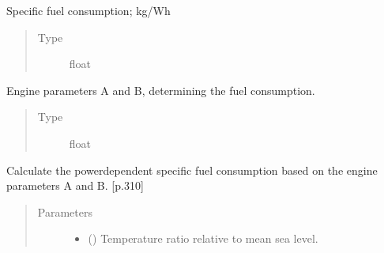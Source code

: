 \documentclass[letterpaper,10pt,english]{sphinxmanual}
\begin{document}
\begin{fulllineitems}
\begin{fulllineitems}
\begin{quote}
\begin{description}
\end{description}\end{quote}

\end{fulllineitems}


\begin{fulllineitems}
\label{\detokenize{modules/engines:engines.Engines.sfc}}
\sphinxAtStartPar
Specific fuel consumption; kg/Wh
\begin{quote}\begin{description}
\item[{Type}] \leavevmode
\sphinxAtStartPar
float

\end{description}\end{quote}

\end{fulllineitems}



\begin{fulllineitems}
\sphinxAtStartPar
Engine parameters A and B, determining the fuel consumption.
\begin{quote}\begin{description}
\item[{Type}] \leavevmode
\sphinxAtStartPar
float

\end{description}\end{quote}

\end{fulllineitems}


\begin{fulllineitems}
\label{\detokenize{modules/engines:engines.Engines.get_sfc}}
\sphinxAtStartPar
Calculate the power\sphinxhyphen{}dependent specific fuel consumption based on the
engine parameters A and B. {[}p.310{]}
\begin{quote}\begin{description}
\item[{Parameters}] \leavevmode\begin{itemize}
\item {} 
\sphinxAtStartPar
{} () \textendash{} Temperature ratio relative to mean sea level.


\end{itemize}
\end{description}
\end{quote}
\end{fulllineitems}
\end{fulllineitems}
\end{document}
